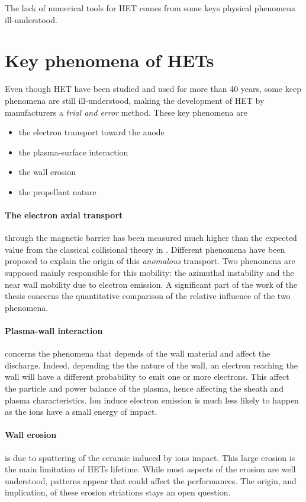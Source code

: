 The lack of numerical tools for \ac{HET}  comes from some keys physical phenomena ill-understood.


\section*{Key phenomena of \ac{HET}s}

Even though \ac{HET} have been studied and used for more than 40 years, some keep phenomena are still ill-understood, making the development of \ac{HET} by manufacturers a \emph{ trial and error} method.
These key phenomena are
\begin{itemize}
  \item the electron transport toward the anode
  \item the plasma-surface interaction 
  \item the wall erosion
  \item the propellant nature
\end{itemize}


\paragraph{The electron axial transport}  through the magnetic barrier has been measured much higher than the expected value from the classical collisional theory in \citet{meezan2001}.
Different phenomena have been proposed to explain the origin of this \emph{anomalous} transport.
Two phenomena are supposed mainly responsible for this mobility: the azimuthal instability and the near wall mobility due to electron emission.
A significant part of the work of the thesis concerns the quantitative comparison of the relative influence of the two phenomena.

\paragraph{Plasma-wall interaction} concerns the phenomena that depends of the wall material and affect the discharge.
Indeed, depending the the nature of the wall, an electron reaching the wall will have a different probability to emit one or more electrons.
This affect the particle and power balance of the plasma, hence affecting the sheath and plasma characteristics.
Ion induce electron emission is much less likely to happen as the ions have a small energy of impact.

\paragraph{Wall erosion} is due to sputtering of the ceramic induced by ions impact.
This large erosion is the main limitation of \ac{HET}s lifetime.
While most aspects of the erosion are well understood, patterns appear that could affect the performances.
The origin, and implication, of these erosion striations stays an open question.

